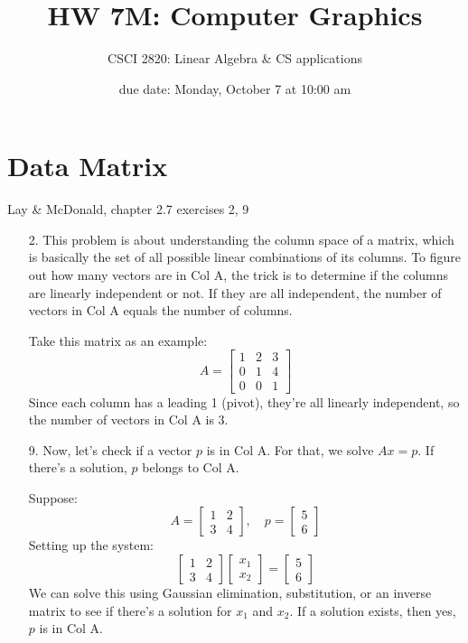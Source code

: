 \documentclass[12pt]{article}
\title{HW 7M: Computer Graphics}
\author{CSCI 2820: Linear Algebra \& CS applications }
\date{due date: Monday, October 7 at 10:00 am}
\theoremstyle{definition}
\begin{document}
\maketitle
\renewcommand{\thefootnote}{\fnsymbol{footnote}}

\section{Data Matrix}

Lay \& McDonald, chapter 2.7 exercises 2, 9

{\color{red}
\begin{enumerate}
    \item[2.] This problem is about understanding the column space of a matrix, which is basically the set of all possible linear combinations of its columns. To figure out how many vectors are in Col A, the trick is to determine if the columns are linearly independent or not. If they are all independent, the number of vectors in Col A equals the number of columns.

    Take this matrix as an example:
    \[
    A = \begin{bmatrix} 
    1 & 2 & 3 \\ 
    0 & 1 & 4 \\ 
    0 & 0 & 1 
    \end{bmatrix}
    \]
    Since each column has a leading 1 (pivot), they’re all linearly independent, so the number of vectors in Col A is 3.

    \item[9.] Now, let’s check if a vector \( p \) is in Col A. For that, we solve \( A x = p \). If there's a solution, \( p \) belongs to Col A. 

    Suppose:
    \[
    A = \begin{bmatrix} 1 & 2 \\ 3 & 4 \end{bmatrix}, \quad p = \begin{bmatrix} 5 \\ 6 \end{bmatrix}
    \]
    Setting up the system:
    \[
    \begin{bmatrix} 1 & 2 \\ 3 & 4 \end{bmatrix} \begin{bmatrix} x_1 \\ x_2 \end{bmatrix} = \begin{bmatrix} 5 \\ 6 \end{bmatrix}
    \]
    We can solve this using Gaussian elimination, substitution, or an inverse matrix to see if there’s a solution for \( x_1 \) and \( x_2 \). If a solution exists, then yes, \( p \) is in Col A.
\end{enumerate}
}
\end{document}
